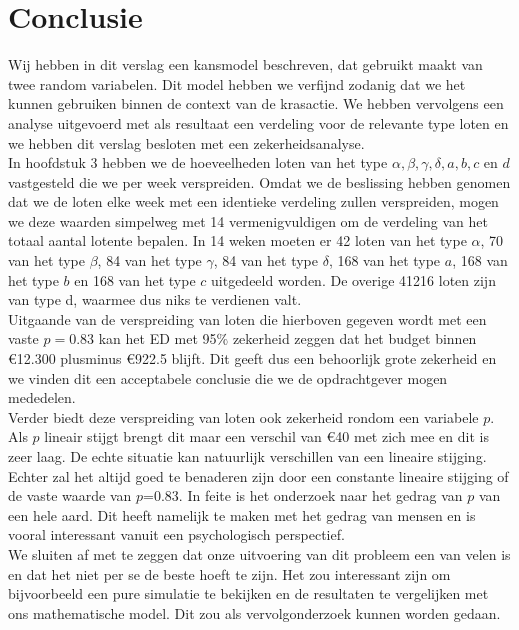 \chapter{Conclusie}\label{cha:discussion}

Wij hebben in dit verslag een kansmodel beschreven, dat gebruikt maakt van twee random variabelen. Dit model hebben we verfijnd zodanig dat we het kunnen gebruiken binnen de context van de krasactie. We hebben vervolgens een analyse uitgevoerd met als resultaat een verdeling voor de relevante type loten en we hebben dit verslag besloten met een zekerheidsanalyse.\\

In hoofdstuk 3 hebben we de hoeveelheden loten van het type $\alpha, \beta, \gamma, \delta, a,b,c$ en $d$ vastgesteld die we per week verspreiden. Omdat we de beslissing hebben genomen dat we de loten elke week met een identieke verdeling zullen verspreiden, mogen we deze waarden simpelweg met 14 vermenigvuldigen om de verdeling van het totaal aantal lotente bepalen. In 14 weken moeten er 42 loten van het type $\alpha$, 70 van het type $\beta$, 84 van het type $\gamma$, 84 van het type $\delta$, 168 van het type $a$, 168 van het type $b$ en 168 van het type $c$ uitgedeeld worden. De overige 41216 loten zijn van type d, waarmee dus niks te verdienen valt.\\

Uitgaande van de verspreiding van loten die hierboven gegeven wordt met een vaste $p = 0.83$ kan het ED met 95$\%$ zekerheid zeggen dat het budget binnen \euro12.300 plusminus \euro922.5 blijft. Dit geeft dus een behoorlijk grote zekerheid en we vinden dit een acceptabele conclusie die we de opdrachtgever mogen mededelen. \\

Verder biedt deze verspreiding van loten ook zekerheid rondom een variabele $p$. Als $p$ lineair stijgt brengt dit maar een verschil van \euro40 met zich mee en dit is zeer laag. De echte situatie kan natuurlijk verschillen van een lineaire stijging. Echter zal het altijd goed te benaderen zijn door een constante lineaire stijging of de vaste waarde van $p$=0.83. In feite is het onderzoek naar het gedrag van $p$ van een hele aard. Dit heeft namelijk te maken met het gedrag van mensen en is vooral interessant vanuit een psychologisch perspectief.\\

We sluiten af met te zeggen dat onze uitvoering van dit probleem een van velen is en dat het niet per se de beste hoeft te zijn. Het zou interessant zijn om bijvoorbeeld een pure simulatie te bekijken en de resultaten te vergelijken met ons mathematische model. Dit zou als vervolgonderzoek kunnen worden gedaan.


